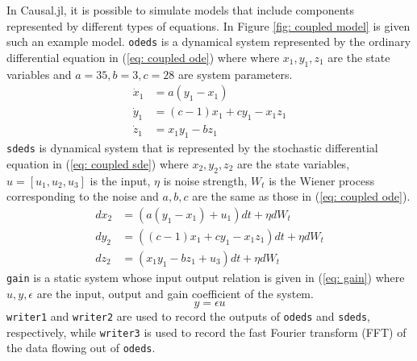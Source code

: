 \documentclass{juliacon}
\begin{document}
In Causal.jl, it is possible to simulate models that include components represented by different types of equations. In Figure \ref{fig: coupled model} is given such an example model. \texttt{odeds} is a dynamical system represented by the ordinary differential equation in (\ref{eq: coupled ode}) where where $x_1, y_1, z_1$ are the state variables and $a=35, b=3, c = 28$ are system parameters.
\begin{equation}
    \begin{split}
        \dot{x}_1 &= a (y_1 - x_1) \\
        \dot{y}_1 &= (c - 1) x_1 + c y_1 - x_1 z_1 \\
        \dot{z}_1 &= x_1 y_1 - b z_1
    \end{split}
    \label{eq: coupled ode}
\end{equation}
\texttt{sdeds} is dynamical system that is represented by the stochastic differential equation in (\ref{eq: coupled sde}) where $x_2, y_2, z_2$ are the state variables, $u=[u_1,u_2, u_3]$ is the input, $\eta$ is noise strength, $W_t$ is the Wiener process corresponding to the noise and $a, b, c$ are the same as those in (\ref{eq: coupled ode}).
\begin{equation}
    \begin{split}
        dx_2 &= (a (y_1 - x_1) + u_1) dt + \eta dW_t \\
        dy_2 &= ((c - 1) x_1 + c y_1 - x_1 z_1)dt + \eta dW_t \\
        dz_2 &= (x_1 y_1 - b z_1 + u_3) dt + \eta dW_t 
    \end{split}
    \label{eq: coupled sde}
\end{equation}
\texttt{gain} is a static system whose input output relation is given in (\ref{eq: gain}) where $u, y, \epsilon$ are the input, output and gain coefficient of the system. 
\begin{equation}
    y = \epsilon u
    \label{eq: gain}
\end{equation}
\texttt{writer1} and \texttt{writer2} are used to record the outputs of \texttt{odeds} and \texttt{sdeds}, respectively, while \texttt{writer3} is used to record the fast Fourier transform (FFT) of the data flowing out of \texttt{odeds}\cite{proakis2004digital}. 
\end{document}
